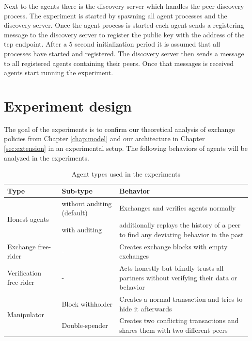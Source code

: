 Next to the agents there is the discovery server which handles the peer discovery process. The 
experiment is started by spawning all agent processes and the discovery server. Once the agent 
process is started each agent sends a registering message to the discovery server to register the 
public key with the address of the tcp endpoint. After a 5 second initialization period it is assumed
that all processes have started and registered. The discovery server then sends a message to all 
registered agents containing their peers. Once that messages is received agents start running the
experiment. 

\section{Experiment design}
The goal of the experiments is to confirm our theoretical analysis of exchange policies from Chapter 
\ref{chap:model} and our architecture in Chapter \ref{sec:extension} in an experimental setup.
The following behaviors of agents will be analyzed in the experiments.

\begin{table}
    \caption{Agent types used in the experiments}
    \label{tab:agent_types}
    \begin{tabular}{p{3cm}|p{3cm}|p{8cm}} \toprule
    \textbf{Type} & \textbf{Sub-type} & \textbf{Behavior} \\ \midrule
    \multirow{2}{3cm}{Honest agents} & without auditing (default) & Exchanges and verifies agents normally \\ \cline{2-3}
    & with auditing & additionally replays the history of a peer to find any deviating behavior in the past \\ \midrule
    Exchange free-rider & - & Creates exchange blocks with empty exchanges \\ 
    \midrule
    Verification free-rider & - & Acts honestly but blindly trusts all partners without verifying their data or behavior \\ \midrule
    \multirow{2}{3cm}{Manipulator } & Block withholder & Creates a normal transaction and tries to hide it afterwards \\ \cline{2-3}
    & Double-spender & Creates two conflicting transactions and shares them with two different peers \\ \bottomrule
    \end{tabular}
\end{table}

